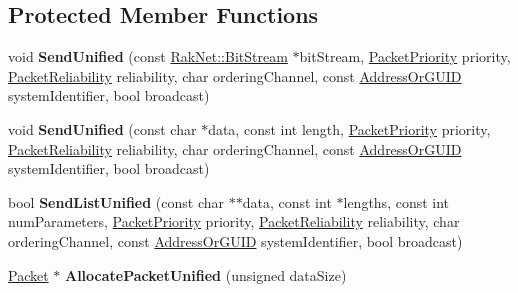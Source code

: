 \subsection*{Protected Member Functions}
\begin{DoxyCompactItemize}
\item 
\hypertarget{class_rak_net_1_1_plugin_interface2_aa820fbdbc19459f63958168d36d8297f}{void {\bfseries Send\-Unified} (const \hyperlink{class_rak_net_1_1_bit_stream}{Rak\-Net\-::\-Bit\-Stream} $\ast$bit\-Stream, \hyperlink{_packet_priority_8h_a659378374e516180f93640c79f59705c}{Packet\-Priority} priority, \hyperlink{_packet_priority_8h_ae41fa01235e99dced384d137fa874a7e}{Packet\-Reliability} reliability, char ordering\-Channel, const \hyperlink{struct_rak_net_1_1_address_or_g_u_i_d}{Address\-Or\-G\-U\-I\-D} system\-Identifier, bool broadcast)}\label{class_rak_net_1_1_plugin_interface2_aa820fbdbc19459f63958168d36d8297f}

\item 
\hypertarget{class_rak_net_1_1_plugin_interface2_a9a32b10a6e57e5b2cbc6677753d59025}{void {\bfseries Send\-Unified} (const char $\ast$data, const int length, \hyperlink{_packet_priority_8h_a659378374e516180f93640c79f59705c}{Packet\-Priority} priority, \hyperlink{_packet_priority_8h_ae41fa01235e99dced384d137fa874a7e}{Packet\-Reliability} reliability, char ordering\-Channel, const \hyperlink{struct_rak_net_1_1_address_or_g_u_i_d}{Address\-Or\-G\-U\-I\-D} system\-Identifier, bool broadcast)}\label{class_rak_net_1_1_plugin_interface2_a9a32b10a6e57e5b2cbc6677753d59025}

\item 
\hypertarget{class_rak_net_1_1_plugin_interface2_a73917c4fd4027b15db907595fc604944}{bool {\bfseries Send\-List\-Unified} (const char $\ast$$\ast$data, const int $\ast$lengths, const int num\-Parameters, \hyperlink{_packet_priority_8h_a659378374e516180f93640c79f59705c}{Packet\-Priority} priority, \hyperlink{_packet_priority_8h_ae41fa01235e99dced384d137fa874a7e}{Packet\-Reliability} reliability, char ordering\-Channel, const \hyperlink{struct_rak_net_1_1_address_or_g_u_i_d}{Address\-Or\-G\-U\-I\-D} system\-Identifier, bool broadcast)}\label{class_rak_net_1_1_plugin_interface2_a73917c4fd4027b15db907595fc604944}

\item 
\hypertarget{class_rak_net_1_1_plugin_interface2_a39ddf0ee0f5de61e562ba0c7460b4f31}{\hyperlink{struct_rak_net_1_1_packet}{Packet} $\ast$ {\bfseries Allocate\-Packet\-Unified} (unsigned data\-Size)}\label{class_rak_net_1_1_plugin_interface2_a39ddf0ee0f5de61e562ba0c7460b4f31}


\end{DoxyCompactItemize}
